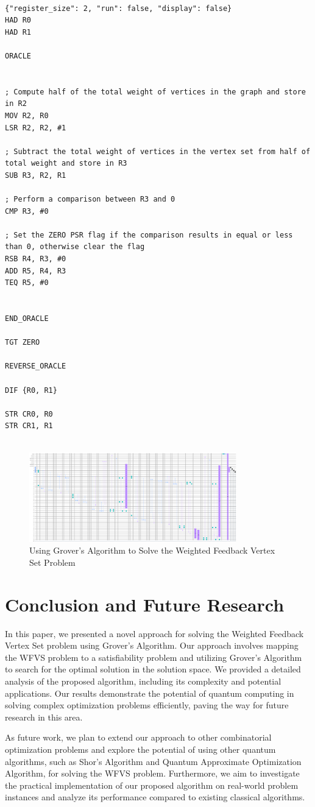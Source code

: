 \begin{lstlisting}

{"register_size": 2, "run": false, "display": false}
HAD R0
HAD R1

ORACLE


; Compute half of the total weight of vertices in the graph and store in R2
MOV R2, R0
LSR R2, R2, #1

; Subtract the total weight of vertices in the vertex set from half of total weight and store in R3
SUB R3, R2, R1

; Perform a comparison between R3 and 0
CMP R3, #0

; Set the ZERO PSR flag if the comparison results in equal or less than 0, otherwise clear the flag
RSB R4, R3, #0
ADD R5, R4, R3
TEQ R5, #0


END_ORACLE

TGT ZERO

REVERSE_ORACLE

DIF {R0, R1}

STR CR0, R0
STR CR1, R1


\end{lstlisting}

\begin{figure}[htp]
    \centering
    \includegraphics[width=9cm]{Figures/Weighted_Feedback_Vertex_Set_circuit.png}
    \caption{Using Grover's Algorithm to Solve the Weighted Feedback Vertex Set Problem}
    \label{fig:Weighted_Feedback_Vertex_Set}
\end{figure}

\section{Conclusion and Future Research}
\label{sec:conclusion}

In this paper, we presented a novel approach for solving the Weighted Feedback Vertex Set problem using Grover's Algorithm. Our approach involves mapping the WFVS problem to a satisfiability problem and utilizing Grover's Algorithm to search for the optimal solution in the solution space. We provided a detailed analysis of the proposed algorithm, including its complexity and potential applications. Our results demonstrate the potential of quantum computing in solving complex optimization problems efficiently, paving the way for future research in this area.

As future work, we plan to extend our approach to other combinatorial optimization problems and explore the potential of using other quantum algorithms, such as Shor's Algorithm and Quantum Approximate Optimization Algorithm, for solving the WFVS problem. Furthermore, we aim to investigate the practical implementation of our proposed algorithm on real-world problem instances and analyze its performance compared to existing classical algorithms.

